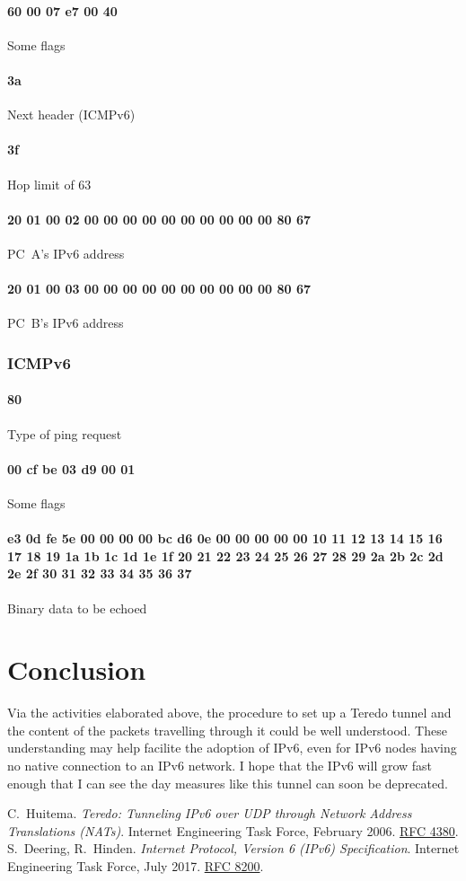 \documentclass[a4paper,12pt]{article}
\begin{document}
\paragraph{60 00 07 e7 00 40} Some flags
\paragraph{3a} Next header (ICMPv6)
\paragraph{3f} Hop limit of 63
\paragraph{20 01 00 02 00 00 00 00 00 00 00 00 00 00 80 67} PC~A's IPv6 address
\paragraph{20 01 00 03 00 00 00 00 00 00 00 00 00 00 80 67} PC~B's IPv6 address

\subsubsection{ICMPv6}
\paragraph{80} Type of ping request
\paragraph{00 cf be 03 d9 00 01} Some flags
\paragraph{e3 0d fe 5e 00 00 00 00 bc d6 0e 00 00 00
00 00 10 11 12 13 14 15 16 17 18 19 1a 1b 1c 1d
1e 1f 20 21 22 23 24 25 26 27 28 29 2a 2b 2c 2d
2e 2f 30 31 32 33 34 35 36 37} Binary data to be echoed

\section{Conclusion}
Via the activities elaborated above, the procedure to set up a Teredo tunnel
and the content of the packets travelling through it could be well understood.
These understanding may help facilite the adoption of IPv6, even for IPv6 nodes
having no native connection to an IPv6 network.  I hope that the IPv6 will grow
fast enough that I can see the day measures like this tunnel can soon
be deprecated.

\begin{thebibliography}{99}
   C.~Huitema.
    \emph{Teredo: Tunneling IPv6 over UDP
          through Network Address Translations (NATs)}.
    Internet Engineering Task Force, February 2006.
    \href{https://tools.ietf.org/html/rfc4380}{RFC 4380}.
   S.~Deering, R.~Hinden.
    \emph{Internet Protocol, Version 6 (IPv6) Specification}.
    Internet Engineering Task Force, July 2017.
    \href{https://tools.ietf.org/html/rfc8200}{RFC 8200}.
\end{thebibliography}
\end{document}
